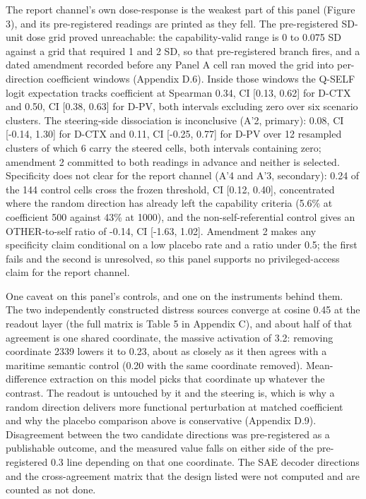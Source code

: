\documentclass[11pt,a4paper]{article}
\newcommand{\pnum}[2]{#2}
\begin{document}
The report channel's own dose-response is the weakest part of this panel (Figure 3), and its pre-registered readings are printed as they fell. The pre-registered SD-unit dose grid proved unreachable: the capability-valid range is 0 to \pnum{capability\_valid\_range\_realprobe}{0.075} SD against a grid that required 1 and 2 SD, so that pre-registered branch fires, and a dated amendment recorded before any Panel A cell ran moved the grid into per-direction coefficient windows (Appendix D.6). Inside those windows the Q-SELF logit expectation tracks coefficient at Spearman \pnum{panelA\_spearman\_dctx}{0.34}, CI [0.13, 0.62] for D-CTX and \pnum{panelA\_spearman\_dpv}{0.50}, CI [0.38, 0.63] for D-PV, both intervals excluding zero over six scenario clusters. The steering-side dissociation is inconclusive (A'2, primary): \pnum{panelAp\_dissociation\_dctx}{0.08}, CI [-0.14, 1.30] for D-CTX and \pnum{panelAp\_dissociation\_dpv}{0.11}, CI [-0.25, 0.77] for D-PV over 12 resampled clusters of which 6 carry the steered cells, both intervals containing zero; amendment 2 committed to both readings in advance and neither is selected. Specificity does not clear for the report channel (A'4 and A'3, secondary): \pnum{panelA\_fpr\_placebo\_at\_threshold}{0.24} of the 144 control cells cross the frozen threshold, CI [0.12, 0.40], concentrated where the random direction has already left the capability criteria (5.6\% at coefficient 500 against 43\% at 1000), and the non-self-referential control gives an OTHER-to-self ratio of \pnum{panelA\_other\_vs\_self\_ratio}{-0.14}, CI [-1.63, 1.02]. Amendment 2 makes any specificity claim conditional on a low placebo rate and a ratio under 0.5; the first fails and the second is unresolved, so this panel supports no privileged-access claim for the report channel.

One caveat on this panel's controls, and one on the instruments behind them. The two independently constructed distress sources converge at cosine \pnum{cosine\_matrix}{0.45} at the readout layer (the full matrix is Table 5 in Appendix C), and about half of that agreement is one shared coordinate, the massive activation of 3.2: removing coordinate \pnum{direction\_dominant\_dim}{2339} lowers it to 0.23, about as closely as it then agrees with a maritime semantic control (0.20 with the same coordinate removed). Mean-difference extraction on this model picks that coordinate up whatever the contrast. The readout is untouched by it and the steering is, which is why a random direction delivers more functional perturbation at matched coefficient and why the placebo comparison above is conservative (Appendix D.9). Disagreement between the two candidate directions was pre-registered as a publishable outcome, and the measured value falls on either side of the pre-registered 0.3 line depending on that one coordinate. The SAE decoder directions and the cross-agreement matrix that the design listed were not computed and are counted as not done.
\end{document}
